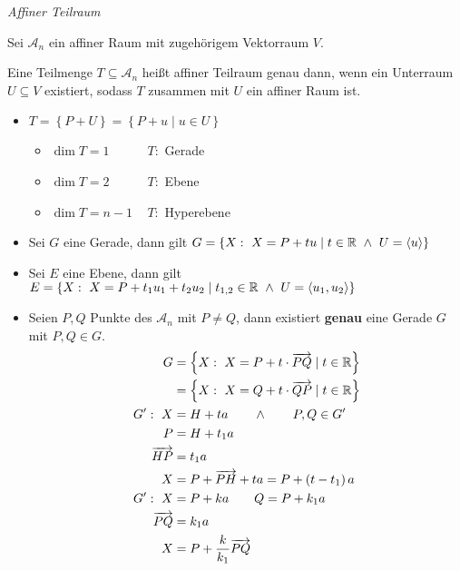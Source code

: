 \begin{mydef}\textit{Affiner Teilraum}

    Sei $\mathcal{A}_n$ ein affiner Raum mit zugehörigem Vektorraum $V$.

    Eine Teilmenge $T \subseteq \mathcal{A}_n$ heißt affiner Teilraum genau dann, wenn ein Unterraum $U \subseteq V$ existiert, sodass $T$ zusammen mit $U$ ein affiner Raum ist.
    \begin{itemize}
        \item $T = \left\{ P + U \right\} = \left\{ P + u \mid u \in U \right\}$
            \begin{itemize}
                \item $\dim T = 1 \qquad\quad T:$ Gerade
                \item $\dim T = 2 \qquad\quad T:$ Ebene
                \item $\dim T = n-1 \quad\, T:$ Hyperebene
            \end{itemize}
        \item Sei $G$ eine Gerade, dann gilt $G = \left\{ X:\ X = P + t u \mid t \in \mathbb{R} \ \wedge \ U = \left\langle u \right\rangle \right\}$
        \item Sei $E$ eine Ebene, dann gilt $E = \left\{ X:\ X = P + t_1 u_1 + t_2 u_2 \mid t_{1,2} \in \mathbb{R} \ \wedge \ U = \left\langle u_1, u_2 \right\rangle \right\}$
        \item Seien $P,Q$ Punkte des $\mathcal{A}_n$ mit $P \neq Q$, dann existiert \textbf{genau} eine Gerade $G$ mit $P,Q \in G$.
            \begin{align*}
                G & = \left\{ X:\ X = P + t \cdot \overrightarrow{PQ} \mid t \in \mathbb{R} \right\}\\
                & = \left\{ X:\ X = Q + t \cdot \overrightarrow{QP} \mid t \in \mathbb{R} \right\}\\
                G' :\ X & = H + t a \qquad \wedge \qquad P,Q \in G'\\
                P & = H + t_1 a\\
                \overrightarrow{HP} & = t_1 a\\
                X & = P + \overrightarrow{PH} + t a = P + \left( t - t_1 \right) a\\
                G' :\ X & = P + k a \qquad Q = P + k_1 a\\
                \overrightarrow{PQ} & = k_1 a\\
                X & = P + \frac{k}{k_1} \overrightarrow{PQ}
            \end{align*}
    \end{itemize}
\end{mydef}

